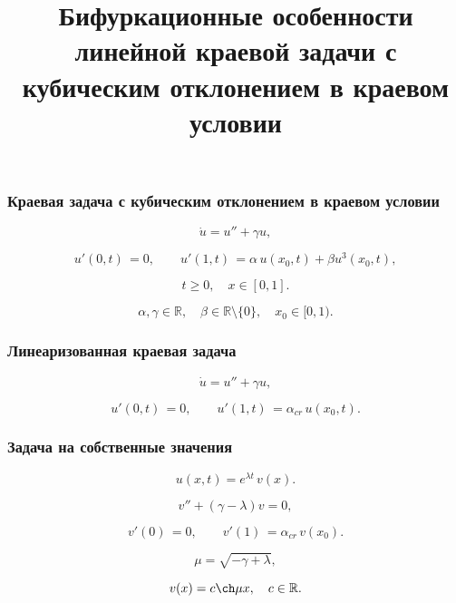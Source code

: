 \documentclass[fullscreen=true, unicode, bookmarks=false]{beamer}
\title[]{ {\huge Бифуркационные особенности линейной краевой задачи с кубическим отклонением в краевом условии } }
\date{ }
\begin{document}
\begin{frame}
\titlepage
\end{frame} 

\begin{frame}
\frametitle{ Краевая задача с кубическим отклонением в краевом условии }
 
\begin{equation}
	\dot u = u'' + \gamma u,	
\end{equation}

\begin{equation}
	u'(0, t) \, = 0, \qquad u'(1, t) \, = \alpha\,u(x_0, t) + \beta u^3(x_0, t),
\end{equation}

\bigskip

$$ t \geqslant 0, \quad x \in [0,1]. $$


$$ \alpha, \gamma \in \mathbb{R}, \quad \beta \in \mathbb{R}\setminus\{ 0\}, \quad x_0 \in [0, 1). $$

\end{frame}

\begin{frame}
\frametitle{ Линеаризованная краевая задача }
 
\begin{equation}
	\dot u = u'' + \gamma u,	
\end{equation}

\begin{equation}	
	u'(0, t) \, = 0, \qquad u'(1, t) \, = \alpha_{cr}\,u(x_0, t).
\end{equation}

\end{frame}

\begin{frame}
\frametitle{ Задача на собственные значения }
 
$$ u(x, t) = e^{\lambda t} \, v(x). $$

\bigskip
 
\begin{equation}
	v'' + (\gamma - \lambda)v = 0,	
\end{equation}

\begin{equation}	
	v'(0) \, = 0, \qquad v'(1) \, = \alpha_{cr}\,v(x_0).
\end{equation}

\bigskip

$$ \mu = \sqrt{-\gamma + \lambda}, $$

$$ v(x) = c \ch  \mu x, \quad c \in \mathbb{R}. $$

\end{frame}
\end{document}
